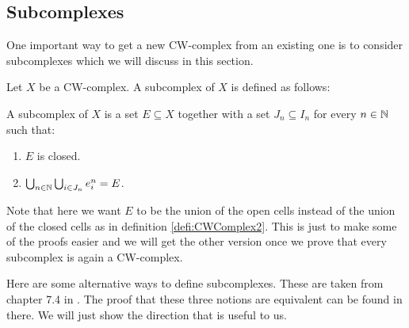\subsection{Subcomplexes}

One important way to get a new CW-complex from an existing one is to consider subcomplexes which we will discuss in this section. 

Let $X$ be a CW-complex. A subcomplex of $X$ is defined as follows:

\begin{defi} \label{defi:subcomplex}
    A subcomplex of $X$ is a set $E \subseteq X$ together with a set $J_n \subseteq I_n$ for every $n \in \bN$ such that:
    \begin{enumerate}
        \item $E$ is closed.
        \item $\bigcup_{n \in \bN} \bigcup_{i \in J_n} \openCell{n}{i} = E$.
    \end{enumerate}
\end{defi}

Note that here we want $E$ to be the union of the open cells instead of the union of the closed cells as in definition \ref{defi:CWComplex2}. 
This is just to make some of the proofs easier and we will get the other version once we prove that every subcomplex is again a CW-complex. 

Here are some alternative ways to define subcomplexes. 
These are taken from chapter 7.4 in \cite{Jänich2001}.
The proof that these three notions are equivalent can be found in there. 
We will just show the direction that is useful to us. 

